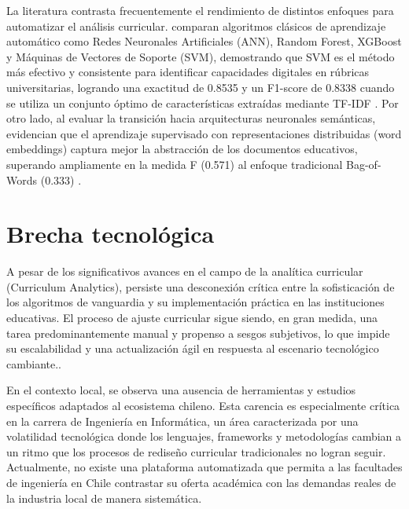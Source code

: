 La literatura  contrasta frecuentemente el rendimiento de distintos enfoques para automatizar el análisis curricular. 
\textcite{fan_identifying_2023} comparan algoritmos clásicos de aprendizaje automático como Redes Neuronales Artificiales (ANN), Random Forest, XGBoost y Máquinas de Vectores de Soporte (SVM), demostrando que SVM es el método más efectivo y consistente para identificar capacidades digitales en rúbricas universitarias, logrando una exactitud de 0.8535 y un F1-score de 0.8338 cuando se utiliza un conjunto óptimo de características extraídas mediante TF-IDF \parencite{fan_identifying_2023}.
Por otro lado, al evaluar la transición hacia arquitecturas neuronales semánticas, \textcite{miura_automated_2021} evidencian que el aprendizaje supervisado con representaciones distribuidas (word embeddings) captura mejor la abstracción de los documentos educativos, superando ampliamente en la medida F (0.571) al enfoque tradicional Bag-of-Words (0.333) \parencite{miura_automated_2021}.










\section{Brecha tecnológica}
\label{cap:brecha}
 A pesar de los significativos avances en el campo de la analítica curricular (Curriculum Analytics), persiste una desconexión crítica entre la sofisticación de los algoritmos de vanguardia y
  su implementación práctica en las instituciones educativas. El proceso de ajuste curricular sigue siendo, en gran medida, una tarea predominantemente manual y propenso a
  sesgos subjetivos, lo que impide su escalabilidad y una actualización ágil en respuesta al escenario tecnológico cambiante..

  En el contexto local, se observa una ausencia de herramientas y estudios específicos adaptados al ecosistema chileno. Esta carencia es especialmente crítica en la carrera
  de Ingeniería en Informática, un área caracterizada por una volatilidad tecnológica  donde los lenguajes, frameworks y metodologías cambian a un ritmo que los procesos de rediseño curricular tradicionales no logran seguir. 
  Actualmente, no existe una plataforma automatizada que permita a las facultades de ingeniería en Chile contrastar su oferta académica con las
  demandas reales de la industria local de manera sistemática.

